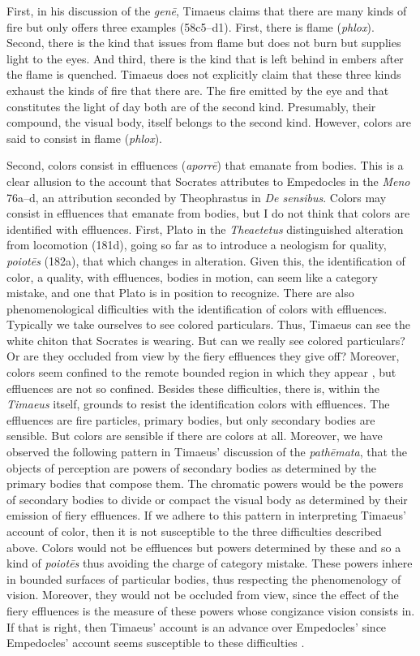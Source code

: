 First, in his discussion of the \emph{genē}, Timaeus claims that there are many kinds of fire but only offers three examples (58c5--d1). First, there is flame (\emph{phlox}). Second, there is the kind that issues from flame but does not burn but supplies light to the eyes. And third, there is the kind that is left behind in embers after the flame is quenched. Timaeus does not explicitly claim that these three kinds exhaust the kinds of fire that there are. The fire emitted by the eye and that constitutes the light of day both are of the second kind. Presumably, their compound, the visual body, itself belongs to the second kind. However, colors are said to consist in flame (\emph{phlox}).

Second, colors consist in effluences (\emph{aporrē}) that emanate from bodies. This is a clear allusion to the account that Socrates attributes to Empedocles in the \emph{Meno} 76a--d, an attribution seconded by Theophrastus in \emph{De sensibus}. Colors may consist in effluences that emanate from bodies, but I do not think that colors are identified with effluences. First, Plato in the \emph{Theaetetus} distinguished alteration from locomotion (181d), going so far as to introduce a neologism for quality, \emph{poiotēs} (182a), that which changes in alteration. Given this, the identification of color, a quality, with effluences, bodies in motion, can seem like a category mistake, and one that Plato is in position to recognize. There are also phenomenological difficulties with the identification of colors with effluences. Typically we take ourselves to see colored particulars. Thus, Timaeus can see the white chiton that Socrates is wearing. But can we really see colored particulars? Or are they occluded from view by the fiery effluences they give off? Moreover, colors seem confined to the remote bounded region in which they appear \citep{Broad:1952kx}, but effluences are not so confined. Besides these difficulties, there is, within the \emph{Timaeus} itself, grounds to resist the identification colors with effluences. The effluences are fire particles, primary bodies, but only secondary bodies are sensible. But colors are sensible if there are colors at all. Moreover, we have observed the following pattern in Timaeus' discussion of the \emph{pathēmata}, that the objects of perception are powers of secondary bodies as determined by the primary bodies that compose them. The chromatic powers would be the powers of secondary bodies to divide or compact the visual body as determined by their emission of fiery effluences. If we adhere to this pattern in interpreting Timaeus' account of color, then it is not susceptible to the three difficulties described above. Colors would not be effluences but powers determined by these and so a kind of \emph{poiotēs} thus avoiding the charge of category mistake. These powers inhere in bounded surfaces of particular bodies, thus respecting the phenomenology of vision. Moreover, they would not be occluded from view, since the effect of the fiery effluences is the measure of these powers whose congizance vision consists in. If that is right, then Timaeus' account is an advance over Empedocles' since Empedocles' account seems susceptible to these difficulties \citep[6]{Kalderon:2015fr}.

